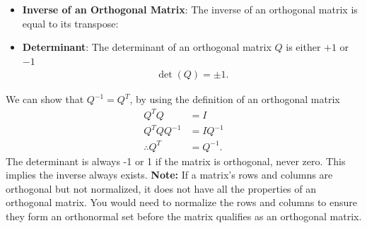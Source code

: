 \documentclass{report}
\begin{document}
\begin{itemize}
\begin{itemize}
                \item \textbf{Inverse of an Orthogonal Matrix}: The inverse of an orthogonal matrix is equal to its transpose:
                \item \textbf{Determinant}: The determinant of an orthogonal matrix $Q$ is either $+1$ or $-1 $
                    \begin{align*}
                        \det{(Q)} = \pm 1
                    .\end{align*}
            \end{itemize}
            \bigbreak \noindent 
            We can show that $Q^{-1} = Q^{T}$, by using the definition of an orthogonal matrix
            \begin{align*}
                Q^{T}Q &= I \\
                Q^{T}QQ^{-1} &= IQ^{-1} \\
                \therefore Q^{T} &= Q^{-1}
            .\end{align*}
            The determinant is always -1 or 1 if the matrix is orthogonal, never zero. This implies the inverse always exists.
            \bigbreak \noindent 
            \textbf{Note:} If a matrix's rows and columns are orthogonal but not normalized, it does not have all the properties of an orthogonal matrix. You would need to normalize the rows and columns to ensure they form an orthonormal set before the matrix qualifies as an orthogonal matrix.

    \end{itemize}

    \pagebreak 
\end{document}
